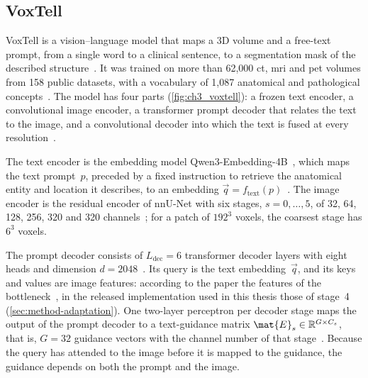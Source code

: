 \subsection{VoxTell}
\label{subsec:bg-voxtell}

VoxTell is a vision--language model that maps a 3D volume and a free-text prompt, from a single word to a clinical sentence, to a segmentation mask of the described structure~\cite[p.~1]{rokuss2025voxtellfreetextpromptableuniversal}.
It was trained on more than 62{,}000 \gls{ct}, \gls{mri} and \gls{pet} volumes from 158 public datasets, with a vocabulary of 1{,}087 anatomical and pathological concepts~\cite[p.~4]{rokuss2025voxtellfreetextpromptableuniversal}.
The model has four parts (\cref{fig:ch3_voxtell}): a frozen text encoder, a convolutional image encoder, a transformer prompt decoder that relates the text to the image, and a convolutional decoder into which the text is fused at every resolution~\cite[Sec.~3]{rokuss2025voxtellfreetextpromptableuniversal}.

The text encoder is the embedding model Qwen3-Embedding-4B~\cite{zhang2025qwen3embedding}, which maps the text prompt~$p$, preceded by a fixed instruction to retrieve the anatomical entity and location it describes, to an embedding $\vec{q} = f_{\mathrm{text}}(p)$~\cite[Eq.~2, Suppl.~p.~1]{rokuss2025voxtellfreetextpromptableuniversal}.
The image encoder is the residual encoder of nnU-Net with six stages, $s = 0, \dots, 5$, of 32, 64, 128, 256, 320 and 320 channels~\cite[Suppl.~p.~1]{rokuss2025voxtellfreetextpromptableuniversal}; for a patch of $192^3$ voxels, the coarsest stage has $6^3$ voxels.

The prompt decoder consists of $L_{\mathrm{dec}} = 6$ transformer decoder layers with eight heads and dimension $d = 2048$~\cite[Sec.~3]{rokuss2025voxtellfreetextpromptableuniversal}.
Its query is the text embedding~$\vec{q}$, and its keys and values are image features: according to the paper the features of the bottleneck~\cite[Eq.~3]{rokuss2025voxtellfreetextpromptableuniversal}, in the released implementation used in this thesis those of stage~4 (\cref{sec:method-adaptation}).
One two-layer perceptron per decoder stage maps the output of the prompt decoder to a text-guidance matrix $\mat{E}_s \in \mathbb{R}^{G \times C_s}$, that is, $G = 32$ guidance vectors with the channel number of that stage~\cite[Sec.~3, Suppl.~p.~1]{rokuss2025voxtellfreetextpromptableuniversal}.
Because the query has attended to the image before it is mapped to the guidance, the guidance depends on both the prompt and the image.

